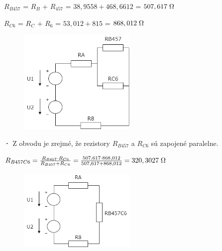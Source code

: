 \begin{center}
$R_{B457}$ = $R_B$ + $R_{457}$ = $ 38,9558 + 468,6612$ = $507,617 \hspace{0,1cm} \SI{}{\ohm}$
\end{center}

\begin{center}
$R_{C6}$ = $R_C$ + $R_6$ = $ 53,012 + 815$ = $868,012 \hspace{0,1cm} \SI{}{\ohm}$
\end{center}

\begin{figure}[h!]
    \centering
    \includegraphics[width=0.5\textwidth]{IEL-Project/pictures/Pr1_5.png}
\end{figure}

\textbf{·}
Z obvodu je zrejmé, že rezistory $R_{B457}$ a $R_{C6}$ sú zapojené paralelne.\\

\begin{center}
$R_{B457C6} = \frac{R_{B457} \cdot R_{C6}}{R_{B457} + R_{C6}} = \frac{507,617 \cdot 868,012}{507,617 + 868,012} = 320,3027 \hspace{0,1cm} \SI{}{\ohm}$
\end{center}

\begin{figure}[h!]
    \centering
    \includegraphics[width=0.5\textwidth]{IEL-Project/pictures/Pr1_6.png}
\end{figure}

